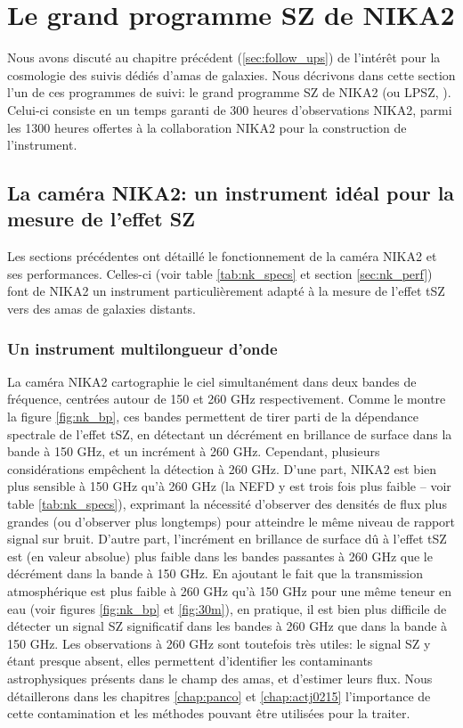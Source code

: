 \section{Le grand programme SZ de NIKA2}\label{sec:lpsz}

Nous avons discuté au chapitre précédent (\ref{sec:follow_ups}) de l'intérêt pour la cosmologie des suivis dédiés d'amas de galaxies.
Nous décrivons dans cette section l'un de ces programmes de suivi: le grand programme SZ de NIKA2 (ou LPSZ, \cite{mayet_cluster_2020}).
Celui-ci consiste en un temps garanti de 300 heures d'observations NIKA2, parmi les 1300 heures offertes à la collaboration NIKA2 pour la construction de l'instrument.

\subsection{La caméra NIKA2: un instrument idéal pour la mesure de l'effet SZ}
\label{sec:nk_sz}

Les sections précédentes ont détaillé le fonctionnement de la caméra NIKA2 et ses performances.
Celles-ci (voir table \ref{tab:nk_specs} et section \ref{sec:nk_perf}) font de NIKA2 un instrument particulièrement adapté à la mesure de l'effet tSZ vers des amas de galaxies distants.

\subsubsection{Un instrument multilongueur d'onde} %
La caméra NIKA2 cartographie le ciel simultanément dans deux bandes de fréquence, centrées autour de 150 et 260 GHz respectivement.
Comme le montre la figure \ref{fig:nk_bp}, ces bandes permettent de tirer parti de la dépendance spectrale de l'effet tSZ, en détectant un décrément en brillance de surface dans la bande à 150 GHz, et un incrément à 260 GHz.
Cependant, plusieurs considérations empêchent la détection à 260 GHz.
D'une part, NIKA2 est bien plus sensible à 150 GHz qu'à 260 GHz (la NEFD y est trois fois plus faible -- voir table \ref{tab:nk_specs}), exprimant la nécessité d'observer des densités de flux plus grandes (ou d'observer plus longtemps)  pour atteindre le même niveau de rapport signal sur bruit.
D'autre part, l'incrément en brillance de surface dû à l'effet tSZ est (en valeur absolue) plus faible dans les bandes passantes à 260 GHz que le décrément dans la bande à 150 GHz.
En ajoutant le fait que la transmission atmosphérique est plus faible à 260 GHz qu'à 150 GHz pour une même teneur en eau (voir figures \ref{fig:nk_bp} et \ref{fig:30m}), en pratique, il est bien plus difficile de détecter un signal SZ significatif dans les bandes à 260 GHz que dans la bande à 150 GHz.
Les observations à 260 GHz sont toutefois très utiles: le signal SZ y étant presque absent, elles permettent d'identifier les contaminants astrophysiques présents dans le champ des amas, et d'estimer leurs flux.
Nous détaillerons dans les chapitres \ref{chap:panco} et \ref{chap:actj0215} l'importance de cette contamination et les méthodes pouvant être utilisées pour la traiter.

